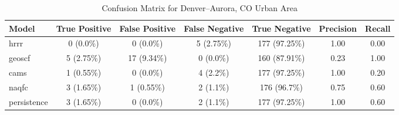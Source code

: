 \begin{table}[h!]
\centering
\begin{tabular}{lcccccc}
\hline
Model & True Positive & False Positive & False Negative & True Negative & Precision & Recall\\ \hline
hrrr & 0 (0.0\%) & 0 (0.0\%) & 5 (2.75\%) & 177 (97.25\%) & \cellcolor{green!25}1.00 & \cellcolor{red!25}0.00 \\ 
geoscf & 5 (2.75\%) & 17 (9.34\%) & 0 (0.0\%) & 160 (87.91\%) & \cellcolor{red!25}0.23 & \cellcolor{green!25}1.00 \\ 
cams & 1 (0.55\%) & 0 (0.0\%) & 4 (2.2\%) & 177 (97.25\%) & \cellcolor{green!25}1.00 & \cellcolor{red!25}0.20 \\ 
naqfc & 3 (1.65\%) & 1 (0.55\%) & 2 (1.1\%) & 176 (96.7\%) & \cellcolor{red!25}0.75 & \cellcolor{green!25}0.60 \\ 
persistence & 3 (1.65\%) & 0 (0.0\%) & 2 (1.1\%) & 177 (97.25\%) & 1.00 & 0.60 \\ 
\hline
\end{tabular}
\caption{Confusion Matrix for Denver--Aurora, CO Urban Area}
\end{table}
